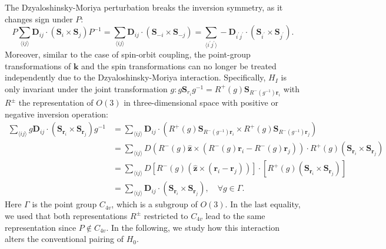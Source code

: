 \documentclass[11pt]{article}
\begin{document}
The Dzyaloshinsky-Moriya perturbation breaks the inversion symmetry, as it changes sign under $P$:
\begin{equation}
    P \sum_{\langle ij \rangle} \bm D_{ij} \cdot (\bm S_i \times \bm S_j) P^{-1}
    = \sum_{\langle ij \rangle} \bm D_{ij} \cdot (\bm S_{-i} \times \bm S_{-j})
    = \sum_{\langle i^\prime j^\prime \rangle} -\bm D_{i^\prime j^\prime}
    \cdot (\bm S_{i^\prime} \times \bm S_{j^\prime}).
\end{equation}
Moreover, similar to the case of spin-orbit coupling, the point-group transformations of $\bm k$
and the spin transformations can no longer be treated independently due to the Dzyaloshinsky-Moriya
interaction. Specifically, $H_I$ is only invariant under the joint transformation
$g: g \bm S_{r_i} g^{-1} = R^{+}(g)\bm S_{R^-(g^{-1}) \bm r_i}$ with
$R^{\pm}$ the representation of $O(3)$ in three-dimensional space with
positive or negative inversion operation:
\begin{equation}
    \begin{aligned}
    \sum_{\langle ij \rangle} g \bm D_{ij}\cdot(\bm S_{\bm r_i} \times \bm S_{\bm r_j}) g^{-1}
    &= \sum_{\langle ij \rangle}  \bm D_{ij}\cdot(R^+(g)\bm S_{R^-(g^{-1}) \bm r_i} \times R^{+}(g)\bm
    S_{R^-(g^{-1}) \bm r_j})\\
    &= \sum_{\langle ij \rangle}  D(R^-(g)\hat{\bm z}\times(R^-(g) \bm r_i - R^-(g)\bm r_j))\cdot R^{+}(g)
    (\bm S_{\bm r_i} \times \bm S_{\bm r_j})\\
    &= \sum_{\langle ij \rangle}  D \left[R^-(g)(\hat{\bm z}\times( \bm r_i - \bm r_j))\right]\cdot
    \left [R^{+}(g) (\bm S_{\bm r_i} \times \bm S_{\bm r_j})\right]\\
    &=\sum_{\langle ij \rangle}  \bm D_{ij}\cdot(\bm S_{\bm r_i} \times \bm S_{\bm r_j}),
    \quad \forall g \in \Gamma.
    \end{aligned}
\end{equation}
Here $\Gamma$ is the point group $C_{4v}$, which is a subgroup of $O(3)$.
In the last equality, we used that both representations $R^{\pm}$ restricted
to $C_{4v}$ lead to the same representation since $P\notin C_{4v}$.
In the following, we study how this interaction alters the conventional pairing of $H_0$.
\end{document}
